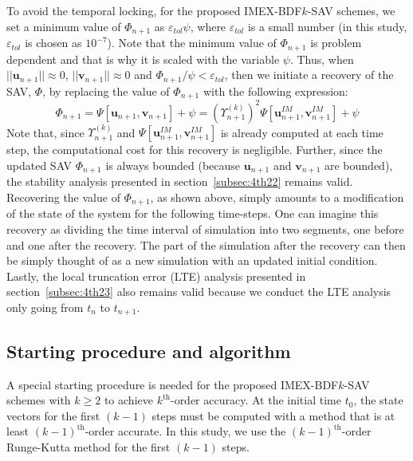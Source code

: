 \documentclass[review]{elsarticle}
\begin{document}
To avoid the temporal locking, for the proposed IMEX-BDF$k$-SAV schemes, we set a minimum value of $\Phi_{n+1}$ as $\varepsilon_{tol} \psi$, where $\varepsilon_{tol}$ is a small number (in this study, $\varepsilon_{tol}$ is chosen as $10^{-7}$).
Note that the minimum value of $\Phi_{n+1}$ is problem dependent and that is why it is scaled with the variable $\psi$.
Thus, when $||\boldsymbol{u}_{n+1}|| \approx 0$, $||\boldsymbol{v}_{n+1}|| \approx 0$ and $\Phi_{n+1}/\psi < \varepsilon  _{tol}$, then we initiate a recovery of the SAV, $\Phi$, by replacing the value of $\Phi_{n+1}$ with the following expression:
\begin{equation}
    \Phi_{n+1} = \Psi[\boldsymbol{u}_{n+1},\boldsymbol{v}_{n+1}] +\psi = \left( \Upsilon_{n+1}^{(k)} \right)^2 \Psi[\boldsymbol{u}^{IM}_{n+1},\boldsymbol{v}^{IM}_{n+1}] +\psi
    \label{eqn:4thRecoverning}
\end{equation}
Note that, since $\Upsilon_{n+1}^{(k)}$ and $\Psi[\boldsymbol{u}^{IM}_{n+1},\boldsymbol{v}^{IM}_{n+1}]$ is already computed at each time step, the computational cost for this recovery is negligible. 
Further, since the updated SAV $\Phi_{n+1}$ is always bounded (because $\boldsymbol{u}_{n+1}$ and $\boldsymbol{v}_{n+1}$ are bounded), the stability analysis presented in section~\ref{subsec:4th22} remains valid.
Recovering the value of $\Phi_{n+1}$, as shown above, simply amounts to a modification of the state of the system for the following time-steps. 
One can imagine this recovery as dividing the time interval of simulation into two segments, one before and one after the recovery.
The part of the simulation after the recovery can then be simply thought of as a new simulation with an updated initial condition.
Lastly, the local truncation error (LTE) analysis presented in section~\ref{subsec:4th23} also remains valid because we conduct the LTE analysis only going from $t_{n}$ to $t_{n+1}$.


\subsection{Starting procedure and algorithm}

A special starting procedure is needed for the proposed IMEX-BDF$k$-SAV schemes with $k\ge2$ to achieve $k^{\textrm{th}}$-order accuracy.
At the initial time $t_0$, the state vectors for the first $(k-1)$ steps must be computed with a method that is at least $(k-1)^{\textrm{th}}$-order accurate. 
In this study, we use the $(k-1)^{\textrm{th}}$-order Runge-Kutta method for the first $(k-1)$ steps.
\end{document}
